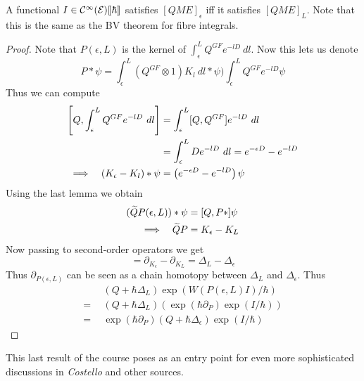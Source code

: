 \begin{prop}
  A functional $I \in \mathcal{C}^{\infty}({\mathcal{E}})\llbracket\hbar\rrbracket$ satisfies $[QME]_\epsilon$ iff it satisfies $[QME]_L$. Note that this is the same as the BV theorem for fibre integrals.
\begin{proof}
  Note that $P(\epsilon,L)$ is the kernel of $\int_\epsilon^L Q^{GF} e^{-lD} \ dl$. Now this lets us denote
  \begin{equation}
    P * \psi = \int_\epsilon^L (Q^{GF} \otimes 1) K_l \ dl * \psi ) \int_\epsilon^L Q^{GF} e^{-lD} \psi
  \end{equation}
  Thus we can compute
  \begin{align}
    \left[Q, \int_\epsilon^L Q^{GF} e^{-lD} \ dl \right] &= \int_\epsilon^L [Q,Q^{GF}] e^{-lD} \ dl \\
    &= \int_\epsilon^L D e^{-lD} \ dl = e^{-\epsilon D} - e^{-l D} \\
    \Lra \quad (K_\epsilon - K_l) * \psi &= \left( e^{-\epsilon D} - e^{-l D} \right) \psi
  \end{align}
  Using the last lemma we obtain
  \begin{align}
    (\widetilde{Q} P(\epsilon,L)) * \psi &= [Q, P *] \psi \\
    \Lra \quad \widetilde{Q} P &= K_\epsilon - K_L
  \end{align}
  Now passing to second-order operators we get
  \begin{equation}
    [Q, \partial_{P(\epsilon,L)}] = \partial_{K_\epsilon} - \partial_{K_L} = \Delta_L - \Delta_\epsilon
  \end{equation}
  Thus $\partial_{P(\epsilon,L)}$ can be seen as a chain homotopy between $\Delta_L$ and $\Delta_\epsilon$. Thus
  \begin{align}
    &(Q + \hbar \Delta_L) \exp(W(P(\epsilon,L)I)/\hbar)\\
    = \ \ &(Q + \hbar \Delta_L) (\exp(\hbar \partial_P) \exp(I/\hbar))\\
    = \ \ &\exp(\hbar \partial_P) (Q + \hbar \Delta_\epsilon) \exp(I/\hbar)
  \end{align}
\end{proof}

\end{prop}

This last result of the course poses as an entry point for even more sophisticated discussions in \textit{Costello} \cite{Costello} and other sources.

~\\
